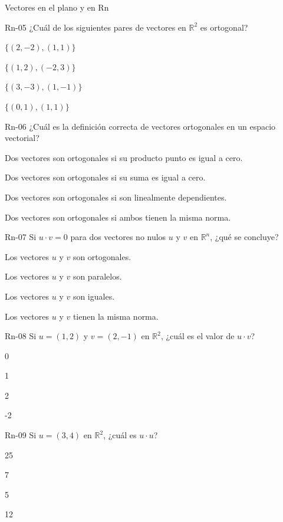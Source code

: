 \documentclass[a4,11pt]{aleph-notas}
\begin{document}
\begin{quiz}{Vectores en el plano y en Rn}
\begin{multi}[]%
    {Rn-05}
    ¿Cuál de los siguientes pares de vectores en \( \mathbb{R}^2 \) es ortogonal?
    \item* $\{ (2, -2), (1, 1) \}$
    \item $\{ (1, 2), (-2, 3) \}$
    \item $\{ (3, -3), (1, -1) \}$
    \item $\{ (0, 1), (1, 1) \}$
\end{multi}

\begin{multi}[]%
    {Rn-06}
    ¿Cuál es la definición correcta de vectores ortogonales en un espacio vectorial?
    \item* Dos vectores son ortogonales si su producto punto es igual a cero.
    \item Dos vectores son ortogonales si su suma es igual a cero.
    \item Dos vectores son ortogonales si son linealmente dependientes.
    \item Dos vectores son ortogonales si ambos tienen la misma norma.
\end{multi}

\begin{multi}[]%
    {Rn-07}
    Si \( u \cdot v = 0 \) para dos vectores no nulos \(u\) y \(v\) en \(\mathbb{R}^n\), ¿qué se concluye?
    \item* Los vectores \(u\) y \(v\) son ortogonales.
    \item Los vectores \(u\) y \(v\) son paralelos.
    \item Los vectores \(u\) y \(v\) son iguales.
    \item Los vectores \(u\) y \(v\) tienen la misma norma.
\end{multi}

\begin{multi}[]%
    {Rn-08}
    Si \(u=(1,2)\) y \(v=(2,-1)\) en \(\mathbb{R}^2\), ¿cuál es el valor de \(u\cdot v\)?
    \item* 0
    \item 1
    \item 2
    \item -2
\end{multi}

\begin{multi}[]%
    {Rn-09}
    Si \(u=(3,4)\) en \(\mathbb{R}^2\), ¿cuál es \(u\cdot u\)?
    \item* 25
    \item 7
    \item 5
    \item 12
\end{multi}


\end{quiz}
\end{document}
